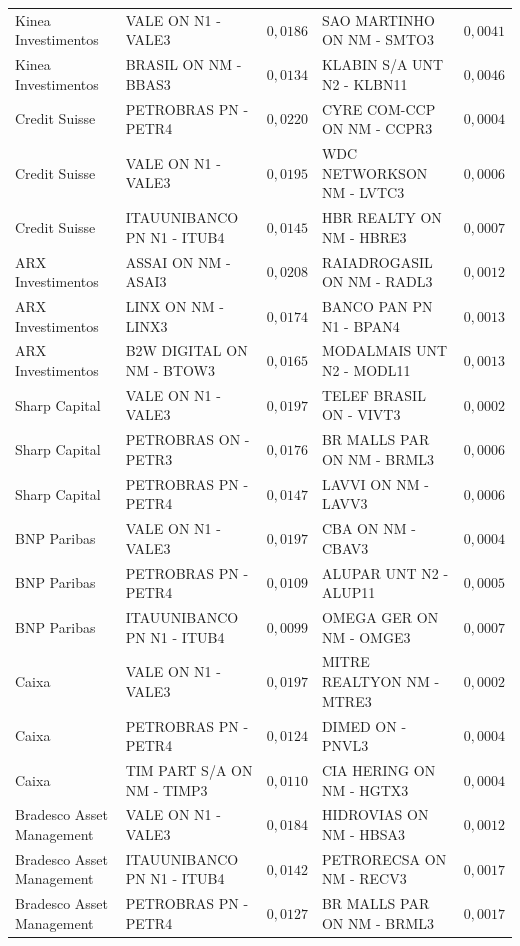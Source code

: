 \documentclass[11pt,a4paper]{article}
\begin{document}
\begin{center}
\begin{longtable}{@{}lp{3.9cm}rp{3.9cm}r@{}}
Kinea Investimentos & VALE ON N1 - VALE3 & $0{,}0186$ & SAO MARTINHO ON NM - SMTO3 & $0{,}0041$ \\
Kinea Investimentos & BRASIL ON NM - BBAS3 & $0{,}0134$ & KLABIN S/A UNT N2 - KLBN11 & $0{,}0046$ \\
Credit Suisse & PETROBRAS PN - PETR4 & $0{,}0220$ & CYRE COM-CCP ON NM - CCPR3 & $0{,}0004$ \\
Credit Suisse & VALE ON N1 - VALE3 & $0{,}0195$ & WDC NETWORKSON NM - LVTC3 & $0{,}0006$ \\
Credit Suisse & ITAUUNIBANCO PN N1 - ITUB4 & $0{,}0145$ & HBR REALTY ON NM - HBRE3 & $0{,}0007$ \\
ARX Investimentos & ASSAI ON NM - ASAI3 & $0{,}0208$ & RAIADROGASIL ON NM - RADL3 & $0{,}0012$ \\
ARX Investimentos & LINX ON NM - LINX3 & $0{,}0174$ & BANCO PAN PN N1 - BPAN4 & $0{,}0013$ \\
ARX Investimentos & B2W DIGITAL ON NM - BTOW3 & $0{,}0165$ & MODALMAIS UNT N2 - MODL11 & $0{,}0013$ \\
Sharp Capital & VALE ON N1 - VALE3 & $0{,}0197$ & TELEF BRASIL ON - VIVT3 & $0{,}0002$ \\
Sharp Capital & PETROBRAS ON - PETR3 & $0{,}0176$ & BR MALLS PAR ON NM - BRML3 & $0{,}0006$ \\
Sharp Capital & PETROBRAS PN - PETR4 & $0{,}0147$ & LAVVI ON NM - LAVV3 & $0{,}0006$ \\
BNP Paribas & VALE ON N1 - VALE3 & $0{,}0197$ & CBA ON NM - CBAV3 & $0{,}0004$ \\
BNP Paribas & PETROBRAS PN - PETR4 & $0{,}0109$ & ALUPAR UNT N2 - ALUP11 & $0{,}0005$ \\
BNP Paribas & ITAUUNIBANCO PN N1 - ITUB4 & $0{,}0099$ & OMEGA GER ON NM - OMGE3 & $0{,}0007$ \\
Caixa & VALE ON N1 - VALE3 & $0{,}0197$ & MITRE REALTYON NM - MTRE3 & $0{,}0002$ \\
Caixa & PETROBRAS PN - PETR4 & $0{,}0124$ & DIMED ON - PNVL3 & $0{,}0004$ \\
Caixa & TIM PART S/A ON NM - TIMP3 & $0{,}0110$ & CIA HERING ON NM - HGTX3 & $0{,}0004$ \\
Bradesco Asset Management & VALE ON N1 - VALE3 & $0{,}0184$ & HIDROVIAS ON NM - HBSA3 & $0{,}0012$ \\
Bradesco Asset Management & ITAUUNIBANCO PN N1 - ITUB4 & $0{,}0142$ & PETRORECSA ON NM - RECV3 & $0{,}0017$ \\
Bradesco Asset Management & PETROBRAS PN - PETR4 & $0{,}0127$ & BR MALLS PAR ON NM - BRML3 & $0{,}0017$ \\

\end{longtable}
\end{center}
\end{document}
